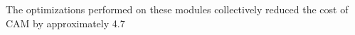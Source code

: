 The optimizations performed on these modules collectively reduced the cost of CAM by approximately 4.7%
